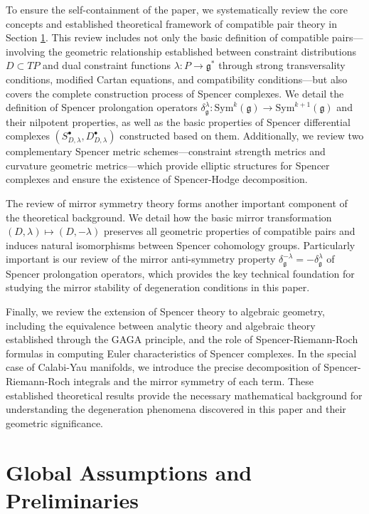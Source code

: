 \documentclass[a4paper,12pt]{extarticle}
\theoremstyle{plain}
\theoremstyle{definition}
\begin{document}
To ensure the self-containment of the paper, we systematically review the core concepts and established theoretical framework of compatible pair theory in Section \ref{sec:background}. This review includes not only the basic definition of compatible pairs—involving the geometric relationship established between constraint distributions $D \subset TP$ and dual constraint functions $\lambda: P \to \mathfrak{g}^*$ through strong transversality conditions, modified Cartan equations, and compatibility conditions—but also covers the complete construction process of Spencer complexes. We detail the definition of Spencer prolongation operators $\delta^\lambda_\mathfrak{g}: \mathrm{Sym}^k(\mathfrak{g}) \to \mathrm{Sym}^{k+1}(\mathfrak{g})$ and their nilpotent properties, as well as the basic properties of Spencer differential complexes $(S^\bullet_{D,\lambda}, D^\bullet_{D,\lambda})$ constructed based on them. Additionally, we review two complementary Spencer metric schemes—constraint strength metrics and curvature geometric metrics—which provide elliptic structures for Spencer complexes and ensure the existence of Spencer-Hodge decomposition.

The review of mirror symmetry theory forms another important component of the theoretical background. We detail how the basic mirror transformation $(D,\lambda) \mapsto (D,-\lambda)$ preserves all geometric properties of compatible pairs and induces natural isomorphisms between Spencer cohomology groups. Particularly important is our review of the mirror anti-symmetry property $\delta^{-\lambda}_\mathfrak{g} = -\delta^\lambda_\mathfrak{g}$ of Spencer prolongation operators, which provides the key technical foundation for studying the mirror stability of degeneration conditions in this paper.

Finally, we review the extension of Spencer theory to algebraic geometry, including the equivalence between analytic theory and algebraic theory established through the GAGA principle, and the role of Spencer-Riemann-Roch formulas in computing Euler characteristics of Spencer complexes. In the special case of Calabi-Yau manifolds, we introduce the precise decomposition of Spencer-Riemann-Roch integrals and the mirror symmetry of each term. These established theoretical results provide the necessary mathematical background for understanding the degeneration phenomena discovered in this paper and their geometric significance.

\section{Global Assumptions and Preliminaries}\label{sec:background}
\end{document}
